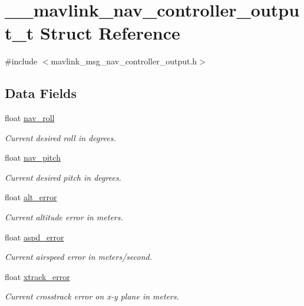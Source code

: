 \hypertarget{struct____mavlink__nav__controller__output__t}{\section{\-\_\-\-\_\-mavlink\-\_\-nav\-\_\-controller\-\_\-output\-\_\-t Struct Reference}
\label{struct____mavlink__nav__controller__output__t}
}


{\ttfamily \#include $<$mavlink\-\_\-msg\-\_\-nav\-\_\-controller\-\_\-output.\-h$>$}

\subsection*{Data Fields}
\begin{DoxyCompactItemize}
\item 
float \hyperlink{struct____mavlink__nav__controller__output__t_a4d11bb9b43d937ab389aab2982ddd1c1}{nav\-\_\-roll}
\begin{DoxyCompactList}\small\item\em Current desired roll in degrees. \end{DoxyCompactList}\item 
float \hyperlink{struct____mavlink__nav__controller__output__t_a12445c329084694f295b51a1f5587691}{nav\-\_\-pitch}
\begin{DoxyCompactList}\small\item\em Current desired pitch in degrees. \end{DoxyCompactList}\item 
float \hyperlink{struct____mavlink__nav__controller__output__t_a40a6a20a742864361b047967ce7eb9df}{alt\-\_\-error}
\begin{DoxyCompactList}\small\item\em Current altitude error in meters. \end{DoxyCompactList}\item 
float \hyperlink{struct____mavlink__nav__controller__output__t_af9d8faadd55533885c61717a7a7ac407}{aspd\-\_\-error}
\begin{DoxyCompactList}\small\item\em Current airspeed error in meters/second. \end{DoxyCompactList}\item 
float \hyperlink{struct____mavlink__nav__controller__output__t_a98cf3736cfd6f54d24effedb10b39cd0}{xtrack\-\_\-error}
\begin{DoxyCompactList}\small\item\em Current crosstrack error on x-\/y plane in meters. \end{DoxyCompactList}\item 

\end{DoxyCompactItemize}
